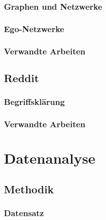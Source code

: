 \documentclass[11pt,a4paper,twoside]{article}
\begin{document}
\hypertarget{graphen-und-netzwerke}{%
\subsubsection{Graphen und Netzwerke}\label{graphen-und-netzwerke}}

\hypertarget{ego-netzwerke}{%
\subsubsection{Ego-Netzwerke}\label{ego-netzwerke}}

\hypertarget{verwandte-arbeiten-1}{%
\subsubsection{Verwandte Arbeiten}\label{verwandte-arbeiten-1}}

\hypertarget{reddit}{%
\subsection{Reddit}\label{reddit}}

\hypertarget{begriffsklarung}{%
\subsubsection{Begriffsklärung}\label{begriffsklarung}}

\hypertarget{verwandte-arbeiten-2}{%
\subsubsection{Verwandte Arbeiten}\label{verwandte-arbeiten-2}}

\cleardoublepage

\hypertarget{datenanalyse}{%
\section{Datenanalyse}\label{datenanalyse}}

\hypertarget{methodik}{%
\subsection{Methodik}\label{methodik}}

\hypertarget{datensatz}{%
\subsubsection{Datensatz}\label{datensatz}}
\end{document}
